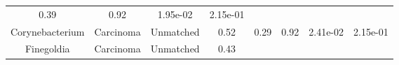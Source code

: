 \documentclass[12pt,]{article}
\begin{document}
\begin{longtable}[]{@{}cccccccc@{}}
\begin{minipage}[t]{0.14\columnwidth}
0.39\strut
\end{minipage} & \begin{minipage}[t]{0.14\columnwidth}\centering\strut
0.92\strut
\end{minipage} & \begin{minipage}[t]{0.06\columnwidth}\centering\strut
1.95e-02\strut
\end{minipage} & \begin{minipage}[t]{0.06\columnwidth}\centering\strut
2.15e-01\strut
\end{minipage}\tabularnewline
\begin{minipage}[t]{0.18\columnwidth}\centering\strut
Corynebacterium\strut
\end{minipage} & \begin{minipage}[t]{0.07\columnwidth}\centering\strut
Carcinoma\strut
\end{minipage} & \begin{minipage}[t]{0.09\columnwidth}\centering\strut
Unmatched\strut
\end{minipage} & \begin{minipage}[t]{0.03\columnwidth}\centering\strut
0.52\strut
\end{minipage} & \begin{minipage}[t]{0.14\columnwidth}\centering\strut
0.29\strut
\end{minipage} & \begin{minipage}[t]{0.14\columnwidth}\centering\strut
0.92\strut
\end{minipage} & \begin{minipage}[t]{0.06\columnwidth}\centering\strut
2.41e-02\strut
\end{minipage} & \begin{minipage}[t]{0.06\columnwidth}\centering\strut
2.15e-01\strut
\end{minipage}\tabularnewline
\begin{minipage}[t]{0.18\columnwidth}\centering\strut
Finegoldia\strut
\end{minipage} & \begin{minipage}[t]{0.07\columnwidth}\centering\strut
Carcinoma\strut
\end{minipage} & \begin{minipage}[t]{0.09\columnwidth}\centering\strut
Unmatched\strut
\end{minipage} & \begin{minipage}[t]{0.03\columnwidth}\centering\strut
0.43\strut
\end{minipage} & \begin{minipage}[t]{0.14\columnwidth}\centering\strut

\end{minipage}
\end{longtable}
\end{document}
